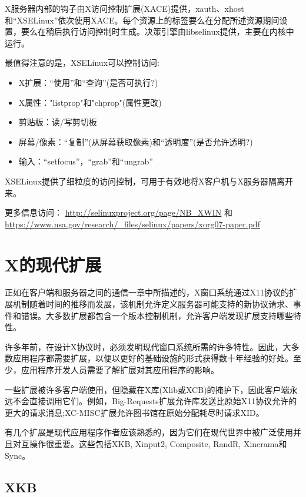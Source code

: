 X服务器内部的钩子由X访问控制扩展(XACE)提供，xauth、xhost和“XSELinux”依次使用XACE。每个资源上的标签要么在分配所述资源期间设置，要么在稍后执行访问控制时生成。决策引擎由libselinux提供，主要在内核中运行。

\noindent 最值得注意的是，XSELinux可以控制访问:

\vspace{-5mm}

\begin{itemize}
	\item X扩展：“使用”和“查询”(是否可执行?)
	\item X属性："listprop"和"chprop"(属性更改)
	\item 剪贴板：读/写剪切板
	\item 屏幕/像素：“复制”(从屏幕获取像素)和“透明度”(是否允许透明?)
	\item 输入：“setfocus”，“grab”和“ungrab”
\end{itemize}

XSELinux提供了细粒度的访问控制，可用于有效地将X客户机与X服务器隔离开来。

\noindent 更多信息访问：
\url{http://selinuxproject.org/page/NB_XWIN}
和
\url{https://www.nsa.gov/research/_files/selinux/papers/xorg07-paper.pdf}

\section{X的现代扩展}

正如在客户端和服务器之间的通信一章中所描述的，X窗口系统通过X11协议的扩展机制随着时间的推移而发展，该机制允许定义服务器可能支持的新协议请求、事件和错误。大多数扩展都包含一个版本控制机制，允许客户端发现扩展支持哪些特性。

许多年前，在设计X协议时，必须发明现代窗口系统所需的许多特性。因此，大多数应用程序都需要扩展，以便以更好的基础设施的形式获得数十年经验的好处。至少，应用程序开发人员需要了解扩展对其应用程序的影响。

一些扩展被许多客户端使用，但隐藏在X库(Xlib或XCB)的掩护下，因此客户端永远不会直接调用它们。例如，Big-Requests扩展允许库发送比原始X11协议允许的更大的请求消息;XC-MISC扩展允许图书馆在原始分配耗尽时请求XID。

有几个扩展是现代应用程序作者应该熟悉的，因为它们在现代世界中被广泛使用并且对互操作很重要。这些包括XKB, Xinput2, Composite, RandR, Xinerama和Sync。

\subsection{XKB}

